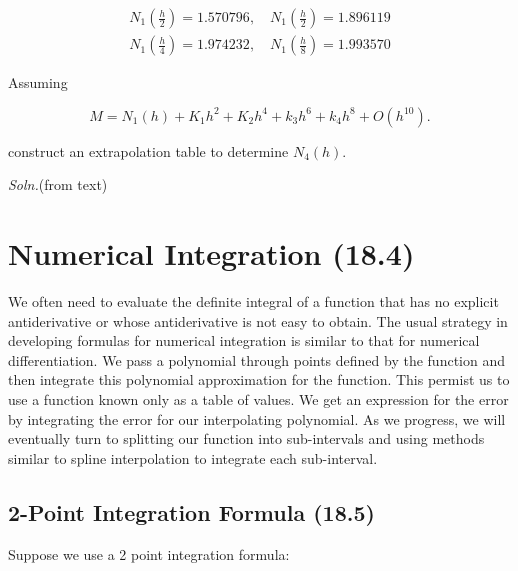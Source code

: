 \documentclass[12pt]{article}
\newcommand{\soln}{\textit{Soln.}\xspace}
\begin{document}
\begin{align*}
N_{1}\left(\frac{h}{2}\right) = 1.570796,\quad 
N_{1}\left(\frac{h}{2}\right) = 1.896119\\[6pt]
N_{1}\left(\frac{h}{4}\right) = 1.974232,\quad 
N_{1}\left(\frac{h}{8}\right) = 1.993570
\end{align*}

Assuming 

\[
M = N_1(h) + K_1h^2 + K_2h^4 + k_3h^6 + k_4h^8 + O(h^{10})
.\]

construct an extrapolation table to determine $N_4(h)$.

\soln (from text)

\pagebreak
\section{Numerical Integration (18.4)}\label{sec:numerical_integration}

We often need to evaluate the definite integral of a function that has no
explicit antiderivative or whose antiderivative is not easy to obtain. The usual
strategy in developing formulas for numerical integration is similar to that for
numerical differentiation. We pass a polynomial through points defined by the
function and then integrate this polynomial approximation for the function. This
permist us to use a function known only as a table of values. We get an
expression for the error by integrating the error for our interpolating
polynomial. As we progress, we will eventually turn to splitting our function
into sub-intervals and using methods similar to spline interpolation to
integrate each sub-interval.

\subsection{2-Point Integration Formula (18.5)}\label{sec:two_point_integration}

Suppose we use a 2 point integration formula:
\end{document}
